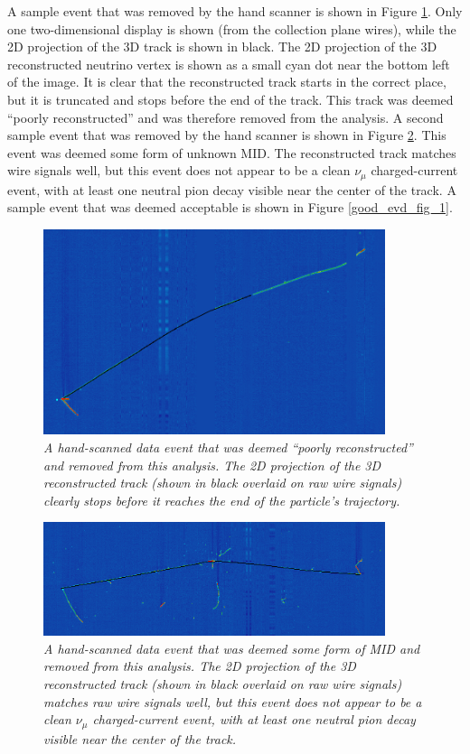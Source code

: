 A sample event that was removed by the hand scanner is shown in Figure \ref{bad_evd_fig_1}. Only one two-dimensional display is shown (from the collection plane wires), while the 2D projection of the 3D track is shown in black. The 2D projection of the 3D reconstructed neutrino vertex is shown as a small cyan dot near the bottom left of the image. It is clear that the reconstructed track starts in the correct place, but it is truncated and stops before the end of the track. This track was deemed ``poorly reconstructed'' and was therefore removed from the analysis. A second sample event that was removed by the hand scanner is shown in Figure \ref{bad_evd_fig_2}. This event was deemed some form of unknown MID. The reconstructed track matches wire signals well, but this event does not appear to be a clean $\nu_\mu$ charged-current event, with at least one neutral pion decay visible near the center of the track. A sample event that was deemed acceptable is shown in Figure \ref{good_evd_fig_1}.

\begin{figure}[ht!]
\begin{center}
\includegraphics[width=100mm]{Figures/bad_evd_1.png}
\end{center}
\caption{\textit{A hand-scanned data event that was deemed ``poorly reconstructed'' and removed from this analysis. The 2D projection of the 3D reconstructed track (shown in black overlaid on raw wire signals) clearly stops before it reaches the end of the particle's trajectory.}}
\label{bad_evd_fig_1}
\end{figure}

\begin{figure}[ht!]
\begin{center}
\includegraphics[width=100mm]{Figures/bad_evd_2.png}
\end{center}
\caption{\textit{A hand-scanned data event that was deemed some form of MID and removed from this analysis. The 2D projection of the 3D reconstructed track (shown in black overlaid on raw wire signals) matches raw wire signals well, but this event does not appear to be a clean $\nu_\mu$ charged-current event, with at least one neutral pion decay visible near the center of the track.}}
\label{bad_evd_fig_2}
\end{figure}

